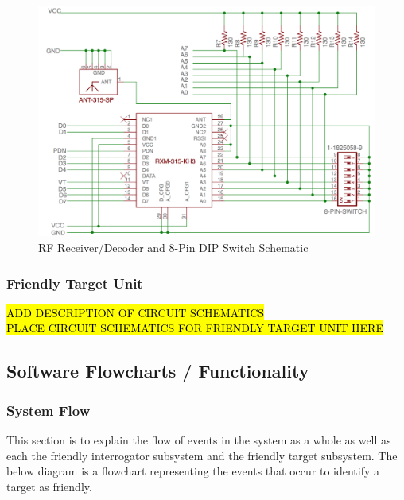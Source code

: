 \documentclass[letterpaper,10pt]{article}
\begin{document}
\begin{spacing}{1.15}
\begin{figure} [H]
	\centering
	\includegraphics[scale=0.5]{RF_Receiver_Decoder_Schematic.png}
	\caption{RF Receiver/Decoder and 8-Pin DIP Switch Schematic\label{fig:rf-receiver-decoder-schematic}}
\end{figure}


\subsubsection{Friendly Target Unit}
\hl{ADD DESCRIPTION OF CIRCUIT SCHEMATICS} \\
\hl{PLACE CIRCUIT SCHEMATICS FOR FRIENDLY TARGET UNIT HERE}

\subsection{Software Flowcharts / Functionality} \label{section-software}
\subsubsection{System Flow}
This section is to explain the flow of events in the system as a whole as well as each the friendly interrogator subsystem and the friendly target subsystem. The below diagram is a flowchart representing the events that occur to identify a target as friendly.


\end{spacing}
\end{document}
